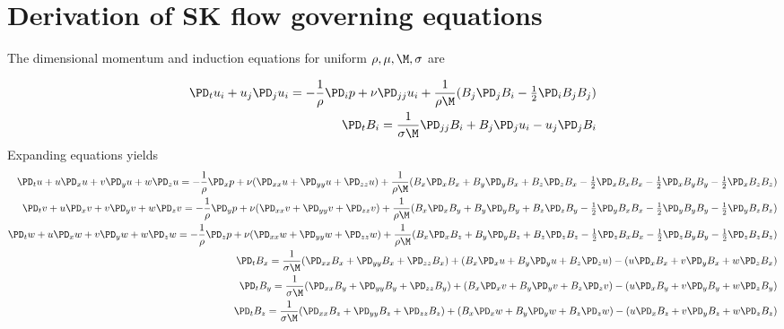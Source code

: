 \documentclass[11pt]{article}
\begin{document}
\doublespacing
\MOONSTITLE
\maketitle

\section{Derivation of SK flow governing equations}

The dimensional momentum and induction equations for uniform $\rho,\mu,\M,\sigma$ are

\begin{equation}\begin{aligned}
\PD_t u_i+u_j\PD_j u_i = - \frac{1}{\rho} \PD_i p+ \nu \PD_{jj} u_i + \frac{1}{\rho \M} (B_j \PD_j B_i - \tfrac{1}{2} \PD_i B_j B_j) \\
\PD_t B_i = \frac{1}{\sigma \M} \PD_{jj} B_i + B_j \PD_j u_i - u_j \PD_j B_i
\end{aligned} \end{equation}
Expanding equations yields
\tiny\begin{equation}\begin{aligned}
\PD_t u+ u\PD_x u + v\PD_y u + w\PD_z u = -\frac{1}{\rho}\PD_x p+ \nu (\PD_{xx} u+\PD_{yy} u+\PD_{zz} u) + \frac{1}{\rho \M} (B_x \PD_x B_x + B_y \PD_y B_x + B_z \PD_z B_x-\tfrac{1}{2}\PD_x B_x B_x-\tfrac{1}{2}\PD_x B_y B_y-\tfrac{1}{2}\PD_x B_z B_z) \\
\PD_t v+ u\PD_x v + v\PD_y v + w\PD_z v = -\frac{1}{\rho}\PD_y p+ \nu (\PD_{xx} v+\PD_{yy} v+\PD_{zz} v) + \frac{1}{\rho \M} (B_x \PD_x B_y + B_y \PD_y B_y + B_z \PD_z B_y-\tfrac{1}{2}\PD_y B_x B_x-\tfrac{1}{2}\PD_y B_y B_y-\tfrac{1}{2}\PD_y B_z B_z) \\
\PD_t w+ u\PD_x w + v\PD_y w + w\PD_z w = -\frac{1}{\rho}\PD_z p+ \nu (\PD_{xx} w+\PD_{yy} w+\PD_{zz} w) + \frac{1}{\rho \M} (B_x \PD_x B_z + B_y \PD_y B_z + B_z \PD_z B_z-\tfrac{1}{2}\PD_z B_x B_x-\tfrac{1}{2}\PD_z B_y B_y-\tfrac{1}{2}\PD_z B_z B_z) \\
\PD_t B_x = \frac{1}{\sigma \M} (\PD_{xx} B_x + \PD_{yy} B_x+\PD_{zz} B_x) + (B_x\PD_x u+B_y\PD_y u+B_z\PD_z u) - (u\PD_x B_x+v\PD_y B_x+w\PD_z B_x) \\
\PD_t B_y = \frac{1}{\sigma \M} (\PD_{xx} B_y + \PD_{yy} B_y+\PD_{zz} B_y) + (B_x\PD_x v+B_y\PD_y v+B_z\PD_z v) - (u\PD_x B_y+v\PD_y B_y+w\PD_z B_y) \\
\PD_t B_z = \frac{1}{\sigma \M} (\PD_{xx} B_z + \PD_{yy} B_z+\PD_{zz} B_z) + (B_x\PD_x w+B_y\PD_y w+B_z\PD_z w) - (u\PD_x B_z+v\PD_y B_z+w\PD_z B_z) \\
\end{aligned} \end{equation}\normalsize
\end{document}

